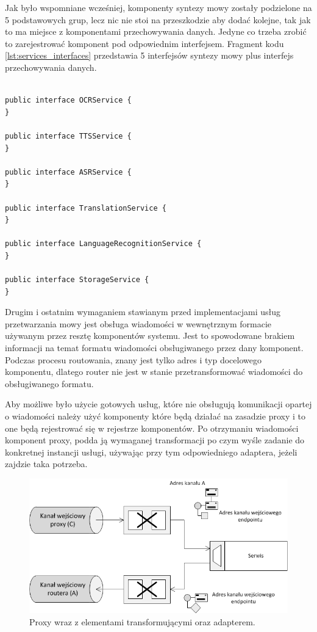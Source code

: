 Jak było wspomniane wcześniej, komponenty syntezy mowy zostały podzielone na 5 podstawowych grup, lecz nic nie stoi na przeszkodzie aby dodać kolejne, tak jak to ma miejsce z komponentami przechowywania danych. Jedyne co trzeba zrobić to zarejestrować komponent pod odpowiednim interfejsem. Fragment kodu \ref{lst:services_interfaces} przedstawia 5 interfejsów syntezy mowy plus interfejs przechowywania danych.

\lstset{language=Java, tabsize=4, caption=Definicja interfejsów komponentów dostarczających usługi przetwarzania mowy i przechowywania danych w języku Java.,label=lst:services_interfaces}

\begin{center}
\begin{lstlisting}

public interface OCRService {
}

public interface TTSService {
}

public interface ASRService {
}

public interface TranslationService {
}

public interface LanguageRecognitionService {
}

public interface StorageService {
}
\end{lstlisting}
\end{center}

Drugim i ostatnim wymaganiem stawianym przed implementacjami usług przetwarzania mowy jest obsługa wiadomości w wewnętrznym formacie używanym przez resztę komponentów systemu. Jest to spowodowane brakiem informacji na temat formatu wiadomości obsługiwanego przez dany komponent. Podczas procesu routowania, znany jest tylko adres i typ docelowego komponentu, dlatego router nie jest w stanie przetransformować wiadomości do obsługiwanego formatu. 


Aby możliwe było użycie gotowych usług, które nie obsługują komunikacji opartej o wiadomości należy użyć komponenty które będą działać na zasadzie proxy i to one będą rejestrować się w rejestrze komponentów. Po otrzymaniu wiadomości komponent proxy, podda ją wymaganej transformacji po czym wyśle zadanie do konkretnej instancji usługi, używając przy tym odpowiedniego adaptera, jeżeli zajdzie taka potrzeba. 

\begin{figure}[!h]
	\centering
	\includegraphics[scale=0.8]{proxy_layer_flow.png}
	\caption{Proxy wraz z elementami transformującymi oraz adapterem. }\label{fig:servis_proxy}
\end{figure}


